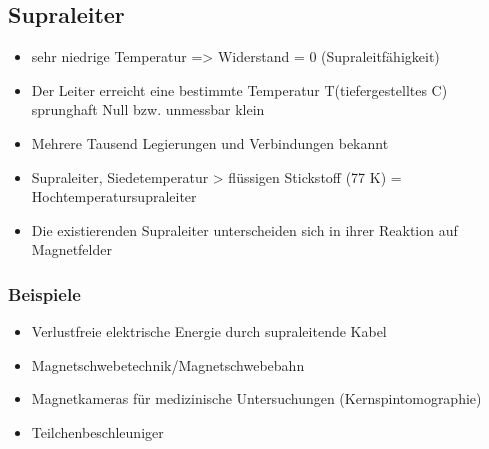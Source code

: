 \documentclass[../../main.tex]{subfiles}
\begin{document}
\subsection{Supraleiter}
\begin{itemize}
    \item sehr niedrige Temperatur => Widerstand = 0 (Supraleitfähigkeit)
    \item Der Leiter erreicht eine bestimmte Temperatur T(tiefergestelltes C) sprunghaft Null bzw. unmessbar klein
    \item Mehrere Tausend Legierungen und Verbindungen bekannt
    \item Supraleiter, Siedetemperatur > flüssigen Stickstoff (77 K) = Hochtemperatursupraleiter
    \item Die existierenden Supraleiter unterscheiden sich in ihrer Reaktion auf Magnetfelder 
\end{itemize}
\subsubsection{Beispiele}
\begin{itemize}
    \item Verlustfreie elektrische Energie durch supraleitende Kabel
    \item Magnetschwebetechnik/Magnetschwebebahn
    \item Magnetkameras für medizinische Untersuchungen (Kernspintomographie)
    \item Teilchenbeschleuniger
\end{itemize}

\end{document}
